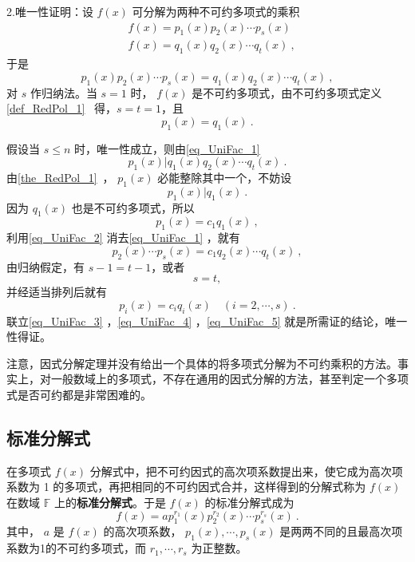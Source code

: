  2.唯一性证明：设 $f(x)$ 可分解为两种不可约多项式的乘积
 \begin{equation}
 \begin{aligned}
 &f(x)=p_1(x)p_2(x)\cdots p_s(x)\\
 &f(x)=q_1(x)q_2(x)\cdots q_t(x)~,
 \end{aligned}
 \end{equation}
 于是
 \begin{equation}\label{eq_UniFac_1}
 p_1(x)p_2(x)\cdots p_s(x)=q_1(x)q_2(x)\cdots q_t(x)~,
 \end{equation}
 对 $s$ 作归纳法。当 $s=1$ 时， $f(x)$ 是不可约多项式，由不可约多项式定义\autoref{def_RedPol_1}~ 得，$s=t=1$，且
 \begin{equation}
 p_1(x)=q_1(x)~.
 \end{equation}
 
 假设当 $s\leq n$ 时，唯一性成立，则由\autoref{eq_UniFac_1} 
 \begin{equation}
 p_1(x)|q_1(x)q_2(x)\cdots q_t(x)~.
 \end{equation}
 由\autoref{the_RedPol_1}~， $p_1(x)$ 必能整除其中一个，不妨设
 \begin{equation}
 p_1(x)|q_1(x)~.
 \end{equation}
 因为 $q_1(x)$ 也是不可约多项式，所以
 \begin{equation}\label{eq_UniFac_2}
 p_1(x)=c_1q_1(x)~,
 \end{equation}
 利用\autoref{eq_UniFac_2} 消去\autoref{eq_UniFac_1} ，就有
 \begin{equation}\label{eq_UniFac_3}
 p_2(x)\cdots p_s(x)=c_1q_2(x)\cdots q_t(x)~,
 \end{equation}
 由归纳假定，有 $s-1=t-1$，或者
 \begin{equation}\label{eq_UniFac_4}
 s=t,
 \end{equation}
 并经适当排列后就有
 \begin{equation}\label{eq_UniFac_5}
 p_i(x)=c_iq_i(x)\quad (i=2,\cdots,s)~.
 \end{equation}
 联立\autoref{eq_UniFac_3} ，\autoref{eq_UniFac_4} ，\autoref{eq_UniFac_5} 就是所需证的结论，唯一性得证。

注意，因式分解定理并没有给出一个具体的将多项式分解为不可约乘积的方法。事实上，对一般数域上的多项式，不存在通用的因式分解的方法，甚至判定一个多项式是否可约都是非常困难的。
\subsection{标准分解式}
在多项式 $f(x)$ 分解式中，把不可约因式的高次项系数提出来，使它成为高次项系数为 1 的多项式，再把相同的不可约因式合并，这样得到的分解式称为 $f(x)$ 在数域 $\mathbb{F}$ 上的\textbf{标准分解式}。于是 $f(x)$ 的标准分解式成为
\begin{equation}
f(x)=ap_1^{r_1}(x)p_2^{r_2}(x)\cdots p_s^{r_s}(x)~.
\end{equation}
其中， $a$ 是 $f(x)$ 的高次项系数， $p_1(x),\cdots,p_s(x)$ 是两两不同的且最高次项系数为1的不可约多项式，而 $r_1,\cdots ,r_s$ 为正整数。

